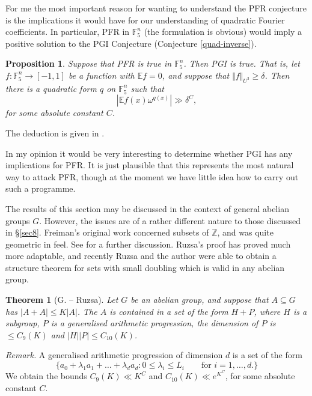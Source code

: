 \documentclass[12pt,a4paper,reqno]{amsart}
\numberwithin{equation}{section}
\theoremstyle{plain}
\newtheorem{theorem}[subsection]{Theorem}
\newtheorem{proposition}[subsection]{Proposition}
\theoremstyle{definition}
\renewcommand{\leq}{\leqslant}
\renewcommand{\geq}{\geqslant}
\begin{document}
\noindent For me the most important reason for wanting to understand the PFR conjecture is the implications it would have for our understanding of quadratic Fourier coefficients. In particular, PFR in $\mathbb{F}_5^n$ (the formulation is obvious) would imply a positive solution to the PGI Conjecture (Conjecture \ref{quad-inverse}).

\begin{proposition}\label{quad-prop} Suppose that \textup{PFR} is true in $\mathbb{F}_5^n$. Then \textup{PGI} is true. That is, let $f : \mathbb{F}_5^n \rightarrow [-1,1]$ be a function with $\mathbb{E}f = 0$, and suppose that $\Vert f \Vert_{U^3} \geq \delta$. Then there is a quadratic form $q$ on $\mathbb{F}_5^n$ such that
\[ |\mathbb{E} f(x) \omega^{q(x)}| \gg \delta^{C},\] for some absolute constant $C$.
\end{proposition}

\noindent The deduction is given in \cite{green-tao-manifesto}.\vspace{11pt}

\noindent In my opinion it would be very interesting to determine whether PGI has any implications for PFR. It is just plausible that this represents the most natural way to attack PFR, though at the moment we have little idea how to carry out such a programme.\vspace{11pt}

\noindent The results of this section may be discussed in the context of general abelian groups $G$. However, the issues are of a rather different nature to those discussed in \S \ref{sec8}. Freiman's original work concerned subsets of $\mathbb{Z}$, and was quite geometric in feel. See \cite{bilu,freiman,green-edinburgh-notes} for a further discussion. Ruzsa's proof \cite{ruzsa-gaps} has proved much more adaptable, and recently Ruzsa and the author \cite{green-ruzsa4} were able to obtain a structure theorem for sets with small doubling which is valid in any abelian group.

\begin{theorem}[G. -- Ruzsa]
Let $G$ be an abelian group, and suppose that $A \subseteq G$ has $|A + A| \leq K|A|$. The $A$ is contained in a set of the form $H + P$, where $H$ is a subgroup, $P$ is a generalised arithmetic progression, the dimension of $P$ is $\leq C_9(K)$ and $|H||P| \leq C_{10}(K)$.
\end{theorem}
\noindent\textit{Remark.} A generalised arithmetic progression of dimension $d$ is a set of the form
\[ \{ a_0 + \lambda_1 a_1 + \dots + \lambda_d a_d : 0 \leq \lambda_i \leq L_i \qquad \mbox{for $i = 1,\dots,d$}.\}\]
We obtain the bounds $C_9(K) \ll K^{C}$ and $C_{10}(K) \ll e^{K^{C}}$, for some absolute constant $C$.
\end{document}
